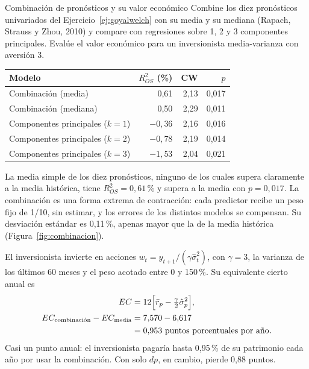 \begin{ejresuelto}{Combinación de pronósticos y su valor económico}\label{ej:combinacion}
\enunciado Combine los diez pronósticos univariados del Ejercicio~\ref{ej:goyalwelch} con su media y su mediana (Rapach, Strauss y Zhou, 2010) y
compare con regresiones sobre 1, 2 y 3 componentes principales. Evalúe el valor económico para un inversionista media-varianza con aversión 3.

\solucion
{}
\begin{center}\small
\begin{tabular}{@{}lrrr@{}}
\toprule
Modelo & $R^2_{OS}$ (\%) & CW & $p$ \\
\midrule
Combinación (media) & 0,61 & 2,13 & 0,017 \\
Combinación (mediana) & 0,50 & 2,29 & 0,011 \\
Componentes principales ($k=1$) & $-0{,}36$ & 2,16 & 0,016 \\
Componentes principales ($k=2$) & $-0{,}78$ & 2,19 & 0,014 \\
Componentes principales ($k=3$) & $-1{,}53$ & 2,04 & 0,021 \\
\bottomrule
\end{tabular}
\end{center}
La media simple de los diez pronósticos, ninguno de los cuales supera claramente a la media histórica, tiene $R^2_{OS}=0{,}61$\,\% y
supera a la media con $p=0{,}017$. La combinación es una forma extrema de contracción: cada predictor recibe un peso fijo de 1/10, sin
estimar, y los errores de los distintos modelos se compensan. Su desviación estándar es 0,11\,\%, apenas mayor que la de la media
histórica (Figura~\ref{fig:combinacion}).

 El inversionista invierte en acciones $w_t=\hat y_{t+1}/(\gamma\hat\sigma^2_t)$, con $\gamma=3$, la varianza de los
últimos 60 meses y el peso acotado entre 0 y 150\,\%. Su equivalente cierto anual es
\begin{align*}
  EC &= 12\Bigl[\bar r_p-\tfrac{\gamma}{2}\hat\sigma^2_p\Bigr],\\
  EC_{\text{combinación}}-EC_{\text{media}} &= 7{,}570-6{,}617\\
                                            &= 0{,}953\ \text{puntos porcentuales por año}.
\end{align*}
Casi un punto anual: el inversionista pagaría hasta 0,95\,\% de su patrimonio cada año por usar la combinación. Con solo $dp$, en cambio,
pierde 0,88 puntos.


\end{ejresuelto}

